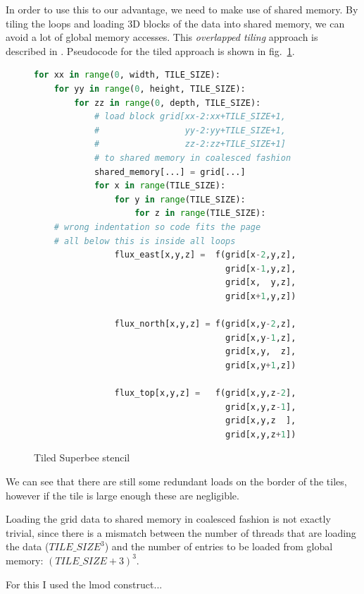 \documentclass[a4paper,oneside]{memoir}
\begin{document}
In order to use this to our advantage, we need to make use of shared memory.
By tiling the loops and loading 3D blocks of the data into shared memory, we can avoid a lot of global memory accesses. This \emph{overlapped tiling} approach is described in \cite{stencil_lift}.
Pseudocode for the tiled approach is shown in fig.~\ref{fig:stencil_tiled}.

\begin{figure}[hbtp]
    \caption{Tiled Superbee stencil}
    \label{fig:stencil_tiled}
    \begin{lstlisting}[language=python,frame=single]
for xx in range(0, width, TILE_SIZE):
    for yy in range(0, height, TILE_SIZE):
        for zz in range(0, depth, TILE_SIZE):
            # load block grid[xx-2:xx+TILE_SIZE+1, 
            #                 yy-2:yy+TILE_SIZE+1,
            #                 zz-2:zz+TILE_SIZE+1]
            # to shared memory in coalesced fashion
            shared_memory[...] = grid[...]
            for x in range(TILE_SIZE):
                for y in range(TILE_SIZE):
                    for z in range(TILE_SIZE):
    # wrong indentation so code fits the page
    # all below this is inside all loops     
                flux_east[x,y,z] =  f(grid[x-2,y,z], 
                                      grid[x-1,y,z],
                                      grid[x,  y,z],
                                      grid[x+1,y,z])

                flux_north[x,y,z] = f(grid[x,y-2,z], 
                                      grid[x,y-1,z],
                                      grid[x,y,  z],
                                      grid[x,y+1,z])

                flux_top[x,y,z] =   f(grid[x,y,z-2], 
                                      grid[x,y,z-1],
                                      grid[x,y,z  ],
                                      grid[x,y,z+1])
    \end{lstlisting}
\end{figure}

We can see that there are still some redundant loads on the border of the tiles, however if the tile is large enough these are negligible. 

Loading the grid data to shared memory in coalesced fashion is not exactly trivial, since there is a mismatch between the number of threads that are loading the data ($TILE\_SIZE^3$) and the number of entries to be loaded from global memory: $(TILE\_SIZE+3)^3$.

For this I used the lmod construct... 
\end{document}
